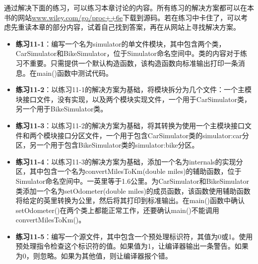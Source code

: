 通过解决下面的练习，可以练习本章讨论的内容。所有练习的解决方案都可以在本书的网站\url{www.wiley.com/go/proc++6e}下载到源码。若在练习中卡住了，可以考虑先重读本章的部分内容，试着自己找到答案，再在从网站上寻找解决方案。

\begin{itemize}
\item
\textbf{练习11-1}：编写一个名为simulator的单文件模块，其中包含两个类，CarSimulator和BikeSimulator，位于Simulator命名空间中。类的内容对于练习不重要。只需提供一个默认构造函数，该构造函数向标准输出打印一条消息。在main()函数中测试代码。

\item
\textbf{练习11-2}：以练习11-1的解决方案为基础，将模块拆分为几个文件：一个主模块接口文件，没有实现，以及两个模块实现文件，一个用于CarSimulator类，另一个用于BikeSimulator类。

\item
\textbf{练习11-3}：以练习11-2的解决方案为基础，将其转换为使用一个主模块接口文件和两个模块接口分区文件，一个用于包含CarSimulator类的simulator:car分区，另一个用于包含BikeSimulator类的simulator:bike分区。

\item
\textbf{练习11-4}：以练习11-3的解决方案为基础，添加一个名为internals的实现分区，其中包含一个名为convertMilesToKm(double miles)的辅助函数，位于Simulator命名空间中。一英里等于1.6公里。为CarSimulator和BikeSimulator类添加一个名为setOdometer(double miles)的成员函数，该函数使用辅助函数将给定的英里转换为公里，然后将其打印到标准输出。在main()函数中确认setOdometer()在两个类上都能正常工作，还要确认main()不能调用convertMilesToKm()。

\item
\textbf{练习11-5}：编写一个源文件，其中包含一个预处理标识符，其值为0或1。使用预处理指令检查这个标识符的值。如果值为1，让编译器输出一条警告。如果为0，则忽略。如果为其他值，则让编译器报个错。
\end{itemize}













